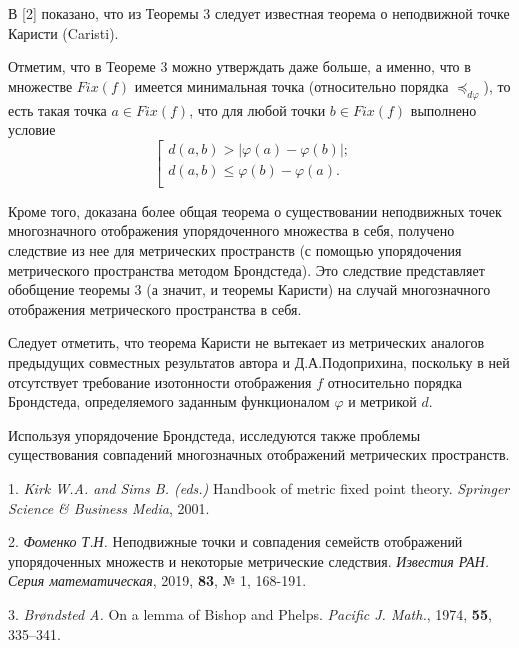 В [2] показано, что  из Теоремы 3 следует известная теорема о неподвижной точке Каристи (Caristi).

Отметим, что в Теореме 3 можно утверждать даже больше, а именно, что в множестве $Fix(f)$ имеется минимальная точка (относительно порядка $\preceq_{d\varphi}$), то есть такая точка $a\in Fix(f)$, что для любой точки $b\in Fix(f)$ выполнено условие
$$
\left [\begin{array}{rl}d(a,b)>|\varphi(a)-\varphi(b)|;&
\\d(a,b)\le\varphi(b)-\varphi(a).\\
\end{array}
\right.
$$

Кроме того, доказана более общая теорема о существовании неподвижных точек многозначного отображения упорядоченного множества в себя, получено следствие из нее для  метрических пространств (с помощью упорядочения метрического пространства методом Брондстеда). Это следствие представляет обобщение теоремы 3 (а значит, и теоремы Каристи) на случай многозначного отображения метрического пространства в себя.

Следует отметить, что теорема Каристи не вытекает из метрических аналогов предыдущих совместных результатов автора и Д.А.Подоприхина, поскольку в ней отсутствует требование изотонности отображения $f$ относительно порядка Брондстеда, определяемого заданным функционалом $\varphi$ и метрикой $d$.

Используя упорядочение Брондстеда, исследуются также проблемы существования совпадений многозначных отображений метрических пространств.

\litlist

1. {\it Kirk W.A. and  Sims B. (eds.)} Handbook of metric fixed point theory. {\it Springer Science \& Business Media},  2001.

2. {\it Фоменко Т.Н.}  Неподвижные точки и совпадения семейств отображений упорядоченных множеств и некоторые метрические следствия. {\it Известия РАН. Серия математическая}, 2019, {\bf 83}, № 1, 168-191.

3. {\it  Br\o ndsted A.} On a lemma of Bishop and Phelps. {\it Pacific J. Math.}, 1974, {\bf 55}, 335--341.
